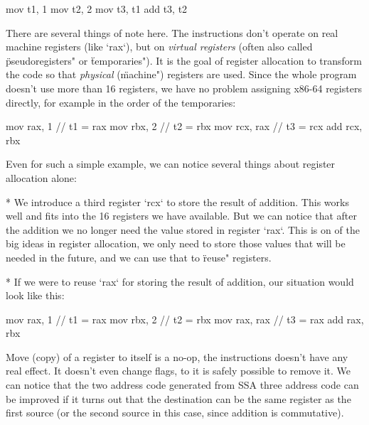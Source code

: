 \begtt
mov t1, 1
mov t2, 2
mov t3, t1
add t3, t2
\endtt

%
%


There are several things of note here. The instructions don't operate on real
machine registers (like `rax`), but on {\em virtual registers} (often also called
\"pseudoregisters" or \"temporaries"). It is the goal of register allocation to
transform the code so that {\em physical} (\"machine") registers are used.
Since the whole program doesn't use more than 16 registers, we have no problem
assigning x86-64 registers directly, for example in the order of the
temporaries:

\begtt
mov rax, 1   // t1 = rax
mov rbx, 2   // t2 = rbx
mov rcx, rax // t3 = rcx
add rcx, rbx
\endtt

Even for such a simple example, we can notice several things about register
allocation alone:

\begitems
 * We introduce a third register `rcx` to store the result of addition. This
works well and fits into the 16 registers we have available. But we can notice
that after the addition we no longer need the value stored in register `rax`.
This is on of the big ideas in register allocation, we only need to store those
values that will be needed in the future, and we can use that to \"reuse"
registers.

* If we were to reuse `rax` for storing the result of addition, our situation
would look like this:

\begtt
mov rax, 1   // t1 = rax
mov rbx, 2   // t2 = rbx
mov rax, rax // t3 = rax
add rax, rbx
\endtt

Move (copy) of a register to itself is a no-op, the instructions doesn't have
any real effect. It doesn't even change flags, to it is safely possible to
remove it. We can notice that the two address code generated
from SSA three address code can be improved if it turns out that the
destination can be the same register as the first source (or the second source
in this case, since addition is commutative).

